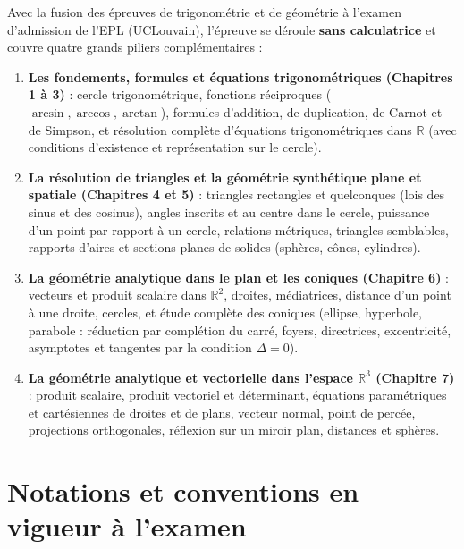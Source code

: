 \documentclass[11pt,a4paper,oneside]{book}
\newcommand{\R}{\mathbb{R}}
\begin{document}
Avec la fusion des épreuves de trigonométrie et de géométrie à l'examen d'admission de l'EPL (UCLouvain), l'épreuve se déroule \textbf{sans calculatrice} et couvre quatre grands piliers complémentaires :
\begin{enumerate}
    \item \textbf{Les fondements, formules et équations trigonométriques (Chapitres 1 à 3)} : cercle trigonométrique, fonctions réciproques ($\arcsin, \arccos, \arctan$), formules d'addition, de duplication, de Carnot et de Simpson, et résolution complète d'équations trigonométriques dans $\R$ (avec conditions d'existence et représentation sur le cercle).
    \item \textbf{La résolution de triangles et la géométrie synthétique plane et spatiale (Chapitres 4 et 5)} : triangles rectangles et quelconques (lois des sinus et des cosinus), angles inscrits et au centre dans le cercle, puissance d'un point par rapport à un cercle, relations métriques, triangles semblables, rapports d'aires et sections planes de solides (sphères, cônes, cylindres).
    \item \textbf{La géométrie analytique dans le plan et les coniques (Chapitre 6)} : vecteurs et produit scalaire dans $\R^2$, droites, médiatrices, distance d'un point à une droite, cercles, et étude complète des coniques (ellipse, hyperbole, parabole : réduction par complétion du carré, foyers, directrices, excentricité, asymptotes et tangentes par la condition $\Delta = 0$).
    \item \textbf{La géométrie analytique et vectorielle dans l'espace $\R^3$ (Chapitre 7)} : produit scalaire, produit vectoriel et déterminant, équations paramétriques et cartésiennes de droites et de plans, vecteur normal, point de percée, projections orthogonales, réflexion sur un miroir plan, distances et sphères.
\end{enumerate}

\section*{Notations et conventions en vigueur à l'examen}
\end{document}

